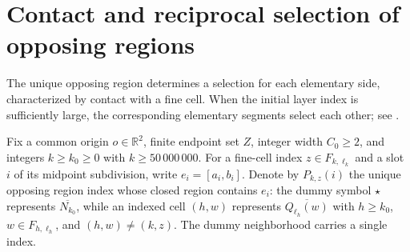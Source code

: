 \section{Contact and reciprocal selection of opposing regions}
\label{sec:area_law_reciprocal_opponents}

The unique opposing region determines a selection for each
elementary side, characterized by contact with a fine cell.
When the initial layer index is sufficiently large, the corresponding
elementary segments select each other; see
\cite[Section~11]{OpenAI2026AreaLaw}.


\begin{definition}
    \label{def:area_law_selected_elementary_opponent}
    \leanok
    Fix a common origin $o\in\mathbb R^2$, finite endpoint set $Z$,
    integer width $C_0\ge2$, and integers $k\ge k_0\ge 0$ with
    $k\ge50\,000\,000$. For a fine-cell index
    $z\in F_{k,\ell_k}$ and a slot $i$ of its midpoint
    subdivision, write $e_i=[a_i,b_i]$.
    Denote by $P_{k,z}(i)$ the unique opposing region index whose closed
    region contains $e_i$: the dummy symbol $\star$ represents
    $\overline{N_{k_0}}$, while an indexed cell $(h,w)$ represents
    $\overline{Q_{\ell_h}(w)}$ with $h\ge k_0$,
    $w\in F_{h,\ell_h}$, and $(h,w)\ne(k,z)$.
    The dummy neighborhood carries a single index.
\end{definition}

